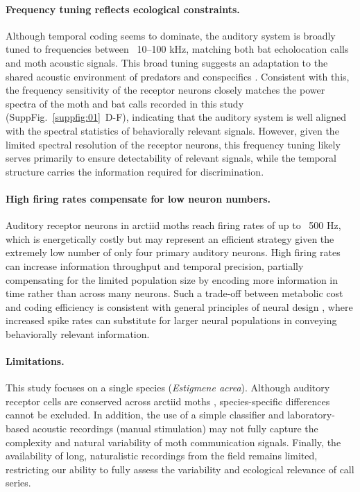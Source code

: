 \documentclass[12pt,a4paper]{article}
\newcommand{\species}[1]{\textit{#1}}
\newcommand{\suppfig}[2]{(SuppFig.~#1~#2)}
\begin{document}
\paragraph{Frequency tuning reflects ecological constraints.}
Although temporal coding seems to dominate, the auditory system is broadly tuned to frequencies between ~10–100 kHz, matching both bat echolocation calls and moth acoustic signals. This broad tuning suggests an adaptation to the shared acoustic environment of predators and conspecifics \parencite{fullard_listening_1984, terhofstede_simple_2013, nakano_moth_2014}. Consistent with this, the frequency sensitivity of the receptor neurons closely matches the power spectra of the moth and bat calls recorded in this study \suppfig{\ref{suppfig:01}}{D-F}, indicating that the auditory system is well aligned with the spectral statistics of behaviorally relevant signals. However, given the limited spectral resolution of the receptor neurons, this frequency tuning likely serves primarily to ensure detectability of relevant signals, while the temporal structure carries the information required for discrimination.

\paragraph{High firing rates compensate for low neuron numbers.}
Auditory receptor neurons in arctiid moths reach firing rates of up to ~500 Hz, which is energetically costly but may represent an efficient strategy given the extremely low number of only four primary auditory neurons. High firing rates can increase information throughput and temporal precision, partially compensating for the limited population size by encoding more information in time rather than across many neurons. Such a trade-off between metabolic cost and coding efficiency is consistent with general principles of neural design \parencite{sterling2015principles}, where increased spike rates can substitute for larger neural populations in conveying behaviorally relevant information.

\paragraph{Limitations.}
This study focuses on a single species (\species{Estigmene acrea}). Although auditory receptor cells are conserved across arctiid moths \parencite{yack_structure_2004}, species-specific differences cannot be excluded. In addition, the use of a simple classifier and laboratory-based acoustic recordings (manual stimulation) may not fully capture the complexity and natural variability of moth communication signals. Finally, the availability of long, naturalistic recordings from the field remains limited, restricting our ability to fully assess the variability and ecological relevance of call series.
\end{document}

